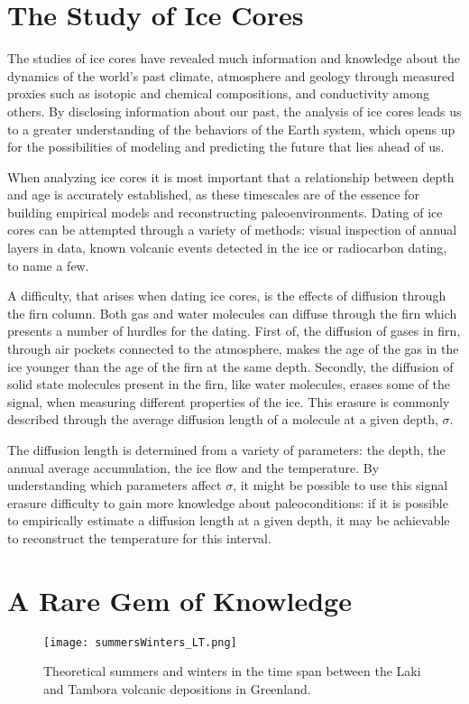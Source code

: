 \documentclass[../../CompleteThesis2/Complete_2ndDraft]{subfiles}
\begin{document}
	
	\section[The Study of Ice Cores]{The Study of Ice Cores}
	\label{Sec:StudyIceCores}
	
	The studies of ice cores have revealed much information and knowledge about the dynamics of the world's past climate, atmosphere and geology through measured proxies such as isotopic and chemical compositions, and conductivity among others. By disclosing information about our past, the analysis of ice cores leads us to a greater understanding of the behaviors of the Earth system, which opens up for the possibilities of modeling and predicting the future that lies ahead of us.
	
	When analyzing ice cores it is most important that a relationship between depth and age is accurately established, as these timescales are of the essence for building empirical models and reconstructing paleoenvironments. Dating of ice cores can be attempted through a variety of methods: visual inspection of annual layers in data, known volcanic events detected in the ice or radiocarbon dating, to name a few. 
	
	A difficulty, that arises when dating ice cores, is the effects of diffusion through the firn column. Both gas and water molecules can diffuse through the firn which presents a number of hurdles for the dating. First of, the diffusion of gases in firn, through air pockets connected to the atmosphere, makes the age of the gas in the ice younger than the age of the firn at the same depth. Secondly, the diffusion of solid state molecules present in the firn, like water molecules, erases some of the signal, when measuring different properties of the ice. This erasure is commonly described through the average diffusion length of a molecule at a given depth, $\sigma$.
	
	The diffusion length is determined from a variety of parameters: the depth, the annual average accumulation, the ice flow and the temperature. By understanding which parameters affect $\sigma$, it might be possible to use this signal erasure difficulty to gain more knowledge about paleoconditions: if it is possible to empirically estimate a diffusion length at a given depth, it may be achievable to reconstruct the temperature for this interval.
	
	
	\section[A Rare Gem]{A Rare Gem of Knowledge}
	\label{Sec:RareGem}
	\begin{figure}
		\centering
		\texttt{[image: summersWinters\_LT.png]}
		\caption[Summers and Winters between Laki and Tambora]{Theoretical summers and winters in the time span between the Laki and Tambora volcanic depositions in Greenland.}
	\end{figure}
	
\end{document}
